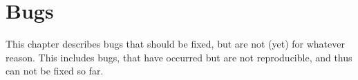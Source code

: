 \chapter{Bugs}
This chapter describes bugs that should be fixed, but are not (yet) for
whatever reason.
This includes bugs, that have occurred but are not reproducible, and
thus can not be fixed so far.
